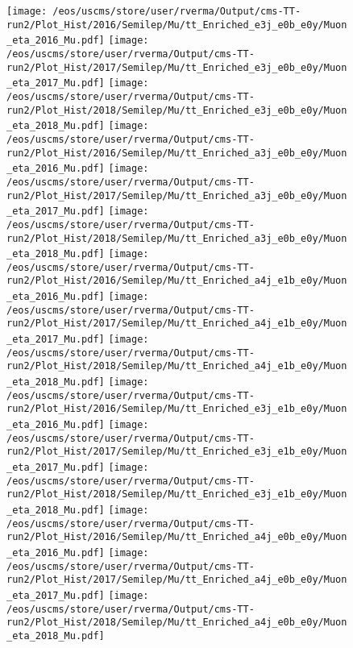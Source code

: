 \begin{figure}
\centering
\texttt{[image: /eos/uscms/store/user/rverma/Output/cms-TT-run2/Plot\_Hist/2016/Semilep/Mu/tt\_Enriched\_e3j\_e0b\_e0y/Muon\_eta\_2016\_Mu.pdf]}
\texttt{[image: /eos/uscms/store/user/rverma/Output/cms-TT-run2/Plot\_Hist/2017/Semilep/Mu/tt\_Enriched\_e3j\_e0b\_e0y/Muon\_eta\_2017\_Mu.pdf]}
\texttt{[image: /eos/uscms/store/user/rverma/Output/cms-TT-run2/Plot\_Hist/2018/Semilep/Mu/tt\_Enriched\_e3j\_e0b\_e0y/Muon\_eta\_2018\_Mu.pdf]}
\texttt{[image: /eos/uscms/store/user/rverma/Output/cms-TT-run2/Plot\_Hist/2016/Semilep/Mu/tt\_Enriched\_a3j\_e0b\_e0y/Muon\_eta\_2016\_Mu.pdf]}
\texttt{[image: /eos/uscms/store/user/rverma/Output/cms-TT-run2/Plot\_Hist/2017/Semilep/Mu/tt\_Enriched\_a3j\_e0b\_e0y/Muon\_eta\_2017\_Mu.pdf]}
\texttt{[image: /eos/uscms/store/user/rverma/Output/cms-TT-run2/Plot\_Hist/2018/Semilep/Mu/tt\_Enriched\_a3j\_e0b\_e0y/Muon\_eta\_2018\_Mu.pdf]}
\texttt{[image: /eos/uscms/store/user/rverma/Output/cms-TT-run2/Plot\_Hist/2016/Semilep/Mu/tt\_Enriched\_a4j\_e1b\_e0y/Muon\_eta\_2016\_Mu.pdf]}
\texttt{[image: /eos/uscms/store/user/rverma/Output/cms-TT-run2/Plot\_Hist/2017/Semilep/Mu/tt\_Enriched\_a4j\_e1b\_e0y/Muon\_eta\_2017\_Mu.pdf]}
\texttt{[image: /eos/uscms/store/user/rverma/Output/cms-TT-run2/Plot\_Hist/2018/Semilep/Mu/tt\_Enriched\_a4j\_e1b\_e0y/Muon\_eta\_2018\_Mu.pdf]}
\texttt{[image: /eos/uscms/store/user/rverma/Output/cms-TT-run2/Plot\_Hist/2016/Semilep/Mu/tt\_Enriched\_e3j\_e1b\_e0y/Muon\_eta\_2016\_Mu.pdf]}
\texttt{[image: /eos/uscms/store/user/rverma/Output/cms-TT-run2/Plot\_Hist/2017/Semilep/Mu/tt\_Enriched\_e3j\_e1b\_e0y/Muon\_eta\_2017\_Mu.pdf]}
\texttt{[image: /eos/uscms/store/user/rverma/Output/cms-TT-run2/Plot\_Hist/2018/Semilep/Mu/tt\_Enriched\_e3j\_e1b\_e0y/Muon\_eta\_2018\_Mu.pdf]}
\texttt{[image: /eos/uscms/store/user/rverma/Output/cms-TT-run2/Plot\_Hist/2016/Semilep/Mu/tt\_Enriched\_a4j\_e0b\_e0y/Muon\_eta\_2016\_Mu.pdf]}
\texttt{[image: /eos/uscms/store/user/rverma/Output/cms-TT-run2/Plot\_Hist/2017/Semilep/Mu/tt\_Enriched\_a4j\_e0b\_e0y/Muon\_eta\_2017\_Mu.pdf]}
\texttt{[image: /eos/uscms/store/user/rverma/Output/cms-TT-run2/Plot\_Hist/2018/Semilep/Mu/tt\_Enriched\_a4j\_e0b\_e0y/Muon\_eta\_2018\_Mu.pdf]}
\end{figure}

